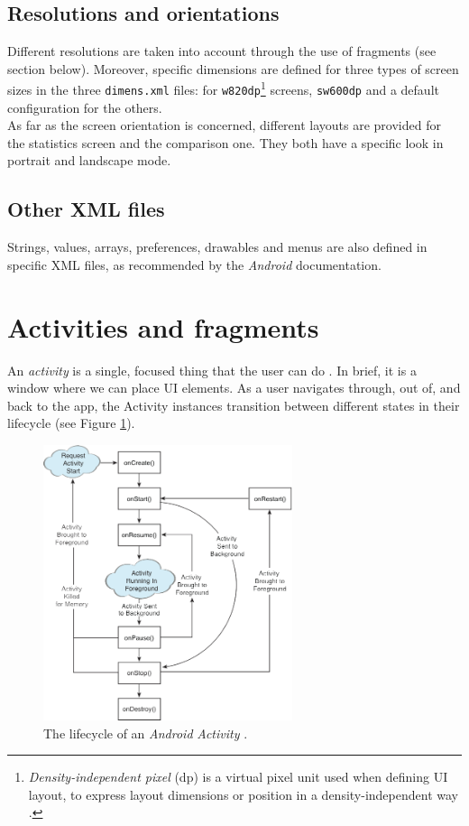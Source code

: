 \documentclass[a4paper, oneside, 11pt]{book}
\begin{document}
\subsection{Resolutions and orientations}
Different resolutions are taken into account through the use of fragments (see section below). Moreover, specific dimensions are defined for three types of screen sizes in the three \texttt{dimens.xml} files:  for \texttt{w820dp}\footnote{\emph{Density-independent pixel} (dp) is a virtual pixel unit used when defining UI layout, to express layout dimensions or position in a density-independent way \cite{screen:online}.}  screens, \texttt{sw600dp} and a default configuration for the others.\\

As far as the screen orientation is concerned, different layouts are provided for the statistics screen and the comparison one. They both have a specific look in portrait and landscape mode. 

\subsection{Other XML files}
Strings, values, arrays, preferences, drawables and menus are also defined in specific XML files, as recommended by the \textit{Android} documentation.

\section{Activities and fragments}
An \emph{activity} is a single, focused thing that the user can do \cite{activity:online}. In brief, it is a window where we can place UI elements. As a user navigates through, out of, and back to the app, the Activity instances transition between different states in their lifecycle (see Figure \ref{fig:lifecycle}).\\

\begin{figure}[htbp]
	\centerline{\includegraphics[width=0.65\textwidth]{lifecycle.png}}
	\caption{The lifecycle of an \textit{Android} \textit{Activity} \cite{introandroid:book}.}
	\label{fig:lifecycle}
\end{figure}
\end{document}
